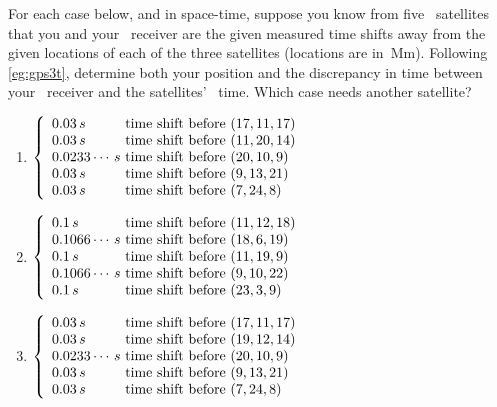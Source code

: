 \begin{exercise} \label{ex:gps3t} 
For each case below, and in space-time, suppose you know from five \gps\ satellites that you and your \gps\ receiver are the given measured time shifts away from the given locations of each of the three satellites (locations are in~Mm).  
Following \cref{eg:gps3t}, determine both your position and the discrepancy in time between your \gps\ receiver and the satellites' \gps\ time.  
Which case needs another satellite?
\begin{enumerate}
\item  
\(\left\{\begin{array}{l@{\text{ time shift before }}l}
0.03\,s&(17,11,17)\\
0.03\,s&(11,20,14)\\
0.0233\cdots\,s&(20,10,9)\\
0.03\,s&(9,13,21)\\
0.03\,s&(7,24,8)
\end{array}\right.\)

\item 
\(\left\{\begin{array}{l@{\text{ time shift before }}l}
0.1\,s&(11,12,18)\\
0.1066\cdots\,s&(18,6,19)\\
0.1\,s&(11,19,9)\\
0.1066\cdots\,s&(9,10,22)\\
0.1\,s&(23,3,9)
\end{array}\right.\)

\item 
\(\left\{\begin{array}{l@{\text{ time shift before }}l}
0.03\,s&(17,11,17)\\
0.03\,s&(19,12,14)\\
0.0233\cdots\,s&(20,10,9)\\
0.03\,s&(9,13,21)\\
0.03\,s&(7,24,8)
\end{array}\right.\)

\end{enumerate}
\end{exercise}




